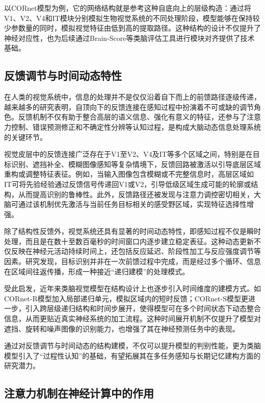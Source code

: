 以CORnet模型为例，它的网络结构就是参考这种自底向上的层级构造：通过将V1、V2、V4和IT模块分别模拟生物视觉系统的不同处理阶段，模型能够在保持较少参数量的同时，模拟视觉特征由低到高的提取路径。这种结构的设计不仅提升了神经对应性，也为后续通过Brain-Score等类脑评估工具进行模块对齐提供了技术基础。

\subsection{反馈调节与时间动态特性}

在人类的视觉系统中，信息的处理并不是仅仅沿着自下而上的前馈路径逐级传递，越来越多的研究表明，自顶向下的反馈连接在感知过程中扮演着不可或缺的调节角色。反馈机制不仅有助于整合高层的语义信息、强化有意义的特征，还参与了注意力控制、错误预测修正和不确定性分辨等认知过程，是构成大脑动态信息处理系统的关键环节。

视觉皮层中的反馈连接广泛存在于V1至V2、V4及IT等多个区域之间，特别是在目标识别、遮挡补全、模糊图像感知等复杂情境下，反馈回路被激活以引导底层区域重构或调整特征表征。例如，当输入图像包含模糊或不完整信息时，高层区域如IT可将先验经验通过反馈信号传递回V1或V2，引导低级区域生成可能的轮廓或结构，从而提高识别的鲁棒性\cite{wyatte2014early}。此外，反馈路径还被发现与注意力调控密切相关，大脑可通过该机制优先激活与当前任务目标相关的感受野区域，实现特征选择性增强\cite{bastos2012canonical}。

除了结构性反馈外，视觉系统还具有显著的时间动态特性，即感知过程不仅是瞬时处理，而且是在数十至数百毫秒的时间窗口内逐步建立稳定表征。这种动态更新不仅反映在神经元活动持续时间上，还包括反应延迟、阶段性加工与反应强度调节等因素。研究发现，目标识别并非在一次前馈过程中完成，而是经过多个循环、信息在区域间往返传播，形成一种接近“递归建模”的处理模式\cite{kar2019evidence}。

受此启发，近年来类脑视觉模型在结构设计上也逐步引入时间维度的建模方式。如CORnet-R模型加入局部递归单元，模拟区域内的短时反馈；CORnet-S模型更进一步，引入跨层级递归结构和时间步展开，使得模型可在多个时间状态下动态整合信息，从而更贴近真实神经系统的加工流程\cite{kubilius2019brain}。这种时间展开机制不仅提升了模型对遮挡、旋转和噪声图像的识别能力，也增强了其在神经预测任务中的表现。

通过对反馈调节与时间动态的结构建模，不仅可以提升模型的判别性能，更为类脑模型引入了“过程性认知”的基础，有望拓展其在多任务感知与长期记忆建构方面的研究潜力。


\subsection{注意力机制在神经计算中的作用}


